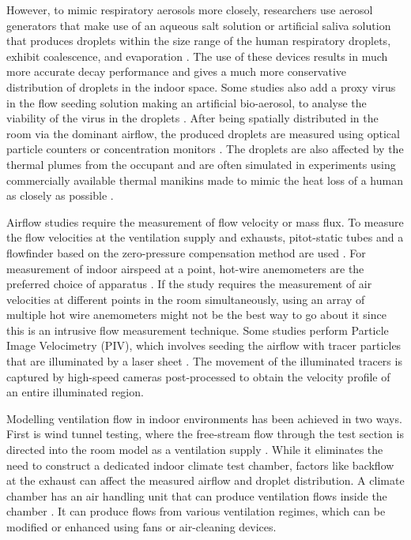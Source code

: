 \documentclass[preprint,12pt]{elsarticle}
\begin{document}
However, to mimic respiratory aerosols more closely, researchers use aerosol generators that make use of an aqueous salt solution or artificial saliva solution that produces droplets within the size range of the human respiratory droplets, exhibit coalescence, and evaporation \cite{zhang2019distribution,zhou2021experimental,jain2023numerical,pan2023predicting}. The use of these devices results in much more accurate decay performance and gives a much more conservative distribution of droplets in the indoor space. Some studies also add a proxy virus in the flow seeding solution making an artificial bio-aerosol, to analyse the viability of the virus in the droplets \cite{oksanen2022combining}. After being spatially distributed in the room via the dominant airflow, the produced droplets are measured using optical particle counters or concentration monitors \cite{romano2015numerical,duill2021impact,quintero2022reducing}. The droplets are also affected by the thermal plumes from the occupant and are often simulated in experiments using commercially available thermal manikins made to mimic the heat loss of a human as closely as possible \cite{he2011cfd,villafruela2019assessment,li2022airborne,li2023transient}. 

Airflow studies require the measurement of flow velocity or mass flux. To measure the flow velocities at the ventilation supply and exhausts, pitot-static tubes and a flowfinder based on the zero-pressure compensation method are used \cite{li2005role,jiang2009investigating}. For measurement of indoor airspeed at a point, hot-wire anemometers are the preferred choice of apparatus \cite{hang2015potential,qin2023transmission}. If the study requires the measurement of air velocities at different points in the room simultaneously, using an array of multiple hot wire anemometers might not be the best way to go about it since this is an intrusive flow measurement technique. Some studies perform Particle Image Velocimetry (PIV), which involves seeding the airflow with tracer particles that are illuminated by a laser sheet \cite{poussou2010flow,abkarian2020speech,liu2021simulation,faleiros2022tu}. The movement of the illuminated tracers is captured by high-speed cameras post-processed to obtain the velocity profile of an entire illuminated region.

Modelling ventilation flow in indoor environments has been achieved in two ways. First is wind tunnel testing, where the free-stream flow through the test section is directed into the room model as a ventilation supply \cite{motamedi2022cfd}. While it eliminates the need to construct a dedicated indoor climate test chamber, factors like backflow at the exhaust can affect the measured airflow and droplet distribution. A climate chamber has an air handling unit that can produce ventilation flows inside the chamber \cite{berrouk2010experimental,cheng2021experimental,lu2022ventilation,li2023numerical}. It can produce flows from various ventilation regimes, which can be modified or enhanced using fans or air-cleaning devices.
\end{document}
